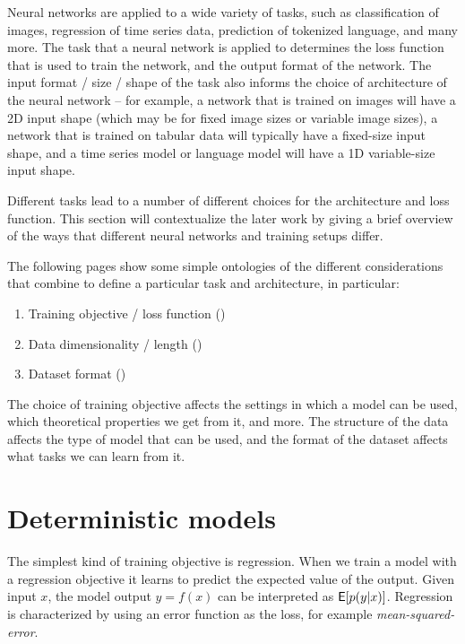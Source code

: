 Neural networks are applied to a wide variety of tasks, such as classification of images, regression of time series data, prediction of tokenized language, and many more. The task that a neural network is applied to determines the loss function that is used to train the network, and the output format of the network. The input format / size / shape of the task also informs the choice of architecture of the neural network -- for example, a network that is trained on images will have a 2D input shape (which may be for fixed image sizes or variable image sizes), a network that is trained on tabular data will typically have a fixed-size input shape, and a time series model or language model will have a 1D variable-size input shape.

Different tasks lead to a number of different choices for the architecture and loss function. This section will contextualize the later work by giving a brief overview of the ways that different neural networks and training setups differ.

The following pages show some simple ontologies of the different considerations that combine to define a particular task and architecture, in particular:
\begin{enumerate}
    \item Training objective / loss function ()
    \item Data dimensionality / length ()
    \item Dataset format ()
\end{enumerate}

\clearpage

The choice of training objective affects the settings in which a model can be used, which theoretical properties we get from it, and more. The structure of the data affects the type of model that can be used, and the format of the dataset affects what tasks we can learn from it.

\section{Deterministic models}

The simplest kind of training objective is regression. When we train a model with a regression objective it learns to predict the expected value of the output. Given input $x$, the model output $y = f(x)$ can be interpreted as $\mathsf{E}[p(y|x)]$. Regression is characterized by using an error function as the loss, for example \textit{mean-squared-error}.

